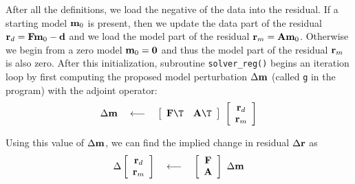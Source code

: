 \par
After all the definitions,
we load the negative of the data into the residual.
If a starting model $\bold m_0$ is present,
then we update the data part of the residual
$\bold r_d=\bold F \bold m_0 - \bold d$
and we load
the model part of the residual
$ \bold r_m = \bold A \bold m_0$.
Otherwise we begin from a zero model $\bold m_0=\bold 0$ and thus
the model part of the residual $ \bold r_m$ is also zero.
After this initialization, subroutine 
\texttt{solver\_reg()} %
begins an iteration loop by first computing
the proposed model perturbation $\Delta \bold m$
(called \texttt{g} in the program)
with the adjoint operator:
\begin{equation}
 \Delta \bold m
 \quad\longleftarrow\quad
 \left[
 \begin{array}{cc}
   \bold F\T &   \bold A\T
 \end{array}
 \right]
 \
 \left[
 \begin{array}{c}
   \bold r_d \\
   \bold r_m
 \end{array}
 \right]
\end{equation}
\begin{comment}
I chose to implement the model roughening operator $\bold A$
with the convolution subroutine \texttt{tcai1()} %
which has transient end effects
(and an output length equal to the input length plus the filter length).
The adjoint of subroutine {\tt tcai1()} suggests perturbations
in the convolution input (not the filter).
\end{comment}
Using this value of $\Delta \bold m$,
we can
find the implied change in residual $\Delta \bold r$ as
\begin{equation}
        \Delta
        \left[
        \begin{array}{c}
        \bold r_d \\
        \bold r_m
        \end{array}
        \right]
\quad\longleftarrow\quad
        \left[
        \begin{array}{c}
        \bold F \\
        \bold A
        \end{array}
        \right]
        \
        \Delta \bold m
\end{equation}
